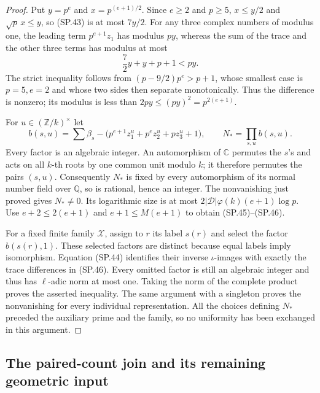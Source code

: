 \begin{proof}
Put $y=p^e$ and $x=p^{(e+1)/2}$.  Since $e\ge2$ and $p\ge5$,
$x\le y/2$ and $\sqrt p\,x\le y$, so (SP.43) is at most
$7y/2$.  For any three complex numbers of modulus one, the leading
term $p^{e+1}z_1$ has modulus $py$, whereas the sum of the trace and
the other three terms has modulus at most
\[
          \frac72y+y+p+1<py.
\]
The strict inequality follows from
$(p-9/2)p^e>p+1$, whose smallest case is $p=5,e=2$ and whose two
sides then separate monotonically.  Thus the difference is nonzero;
its modulus is less than $2py\le (py)^2=p^{2(e+1)}$.

For $u\in(\mathbb Z/k)^\times$ let
\[
 b(s,u)=\sum\beta_s-
          \bigl(p^{e+1}z_1^u+p^ez_2^u+pz_3^u+1\bigr),
 \qquad N_* =\prod_{s,u}b(s,u).
 \tag{SP.47}
\]
Every factor is an algebraic integer.  An automorphism of
$\mathbb C$ permutes the $s$'s and acts on all $k$-th roots by one
common unit modulo $k$; it therefore permutes the pairs $(s,u)$.
Consequently $N_*$ is fixed by every automorphism of its normal
number field over $\mathbb Q$, so is rational, hence an integer.
The nonvanishing just proved gives $N_*\ne0$.  Its logarithmic
size is at most
$2|\mathcal D|\varphi(k)(e+1)\log p$.
Use $e+2\le2(e+1)$ and $e+1\le M(e+1)$ to obtain (SP.45)--(SP.46).

For a fixed finite family $\mathcal X$, assign to $r$ its label
$s(r)$ and select the factor $b(s(r),1)$.  These selected factors
are distinct because equal labels imply isomorphism.  Equation
(SP.44) identifies their inverse $\iota$-images with exactly the
trace differences in (SP.46).  Every omitted factor is still an
algebraic integer and thus has $\ell$-adic norm at most one.
Taking the norm of the complete product proves the asserted
inequality.  The same argument with a singleton proves the
nonvanishing for every individual representation.  All the choices
defining $N_*$ preceded the auxiliary prime and the family, so no
uniformity has been exchanged in this argument.
\end{proof}

\subsection{The paired-count join and its remaining geometric input}

